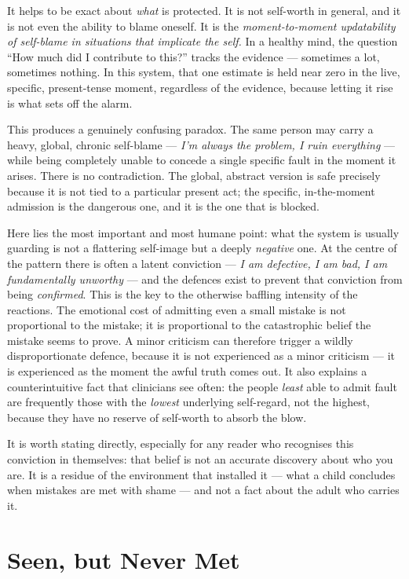 \documentclass{article}
\begin{document}
It helps to be exact about \textit{what} is protected. It is not self-worth in general, and it is not even the ability to blame oneself. It is the \textit{moment-to-moment updatability of self-blame in situations that implicate the self.} In a healthy mind, the question \enquote{How much did I contribute to this?} tracks the evidence --- sometimes a lot, sometimes nothing. In this system, that one estimate is held near zero in the live, specific, present-tense moment, regardless of the evidence, because letting it rise is what sets off the alarm.

This produces a genuinely confusing paradox. The same person may carry a heavy, global, chronic self-blame --- \textit{I'm always the problem, I ruin everything} --- while being completely unable to concede a single specific fault in the moment it arises. There is no contradiction. The global, abstract version is safe precisely because it is not tied to a particular present act; the specific, in-the-moment admission is the dangerous one, and it is the one that is blocked.

Here lies the most important and most humane point: what the system is usually guarding is not a flattering self-image but a deeply \textit{negative} one. At the centre of the pattern there is often a latent conviction --- \textit{I am defective, I am bad, I am fundamentally unworthy} --- and the defences exist to prevent that conviction from being \textit{confirmed}. This is the key to the otherwise baffling intensity of the reactions. The emotional cost of admitting even a small mistake is not proportional to the mistake; it is proportional to the catastrophic belief the mistake seems to prove. A minor criticism can therefore trigger a wildly disproportionate defence, because it is not experienced as a minor criticism --- it is experienced as the moment the awful truth comes out. It also explains a counterintuitive fact that clinicians see often: the people \textit{least} able to admit fault are frequently those with the \textit{lowest} underlying self-regard, not the highest, because they have no reserve of self-worth to absorb the blow.

It is worth stating directly, especially for any reader who recognises this conviction in themselves: that belief is not an accurate discovery about who you are. It is a residue of the environment that installed it --- what a child concludes when mistakes are met with shame --- and not a fact about the adult who carries it.

\section*{Seen, but Never Met}
\end{document}
